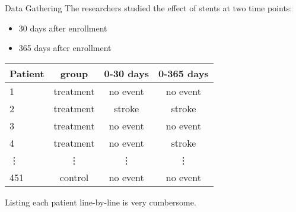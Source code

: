 \documentclass{beamer}
\begin{document}
\begin{frame}
\begin{block}{Data Gathering}
The researchers studied the effect of stents at two time points:\pause
\begin{itemize}
\item 30 days after enrollment\pause
\item 365 days after enrollment\pause
\end{itemize}
\end{block}

\begin{data}
\begin{center}
\begin{tabular}{lccc}\hline
Patient & group & 0-30 days & 0-365 days \\\hline
1 & treatment & no event & no event \\
2 & treatment & stroke & stroke \\
3 & treatment & no event & no event \\
4 & treatment & no event & stroke \\
\vdots & \vdots & \vdots & \vdots \\
451 & control & no event & no event
\end{tabular}
\end{center}
\end{data}\pause

\begin{note}
Listing each patient line-by-line is very cumbersome.
\end{note}
\end{frame}
\end{document}
